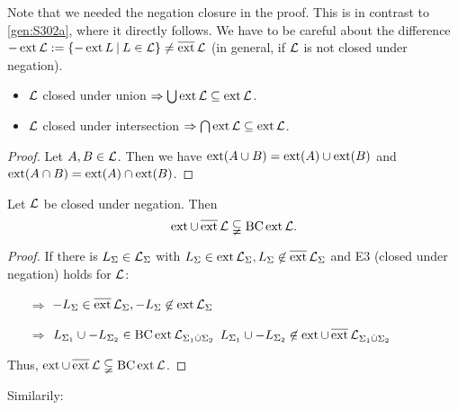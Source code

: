 Note that we needed the negation closure in the proof. This is in contrast to \ref{gen:S302a}, where it directly follows. We have to be careful about the difference $- \ext \Lang := \Set{-\ext L}{L \in \Lang} \neq \dext \Lang$ (in general, if $\mathcal{L}$ is not closed under negation).

\begin{lemma}
\begin{itemize}
\item
$\mathcal{L}$ closed under union $\Rightarrow \bigcup \operatorname{ext} \mathcal{L} \subseteq \operatorname{ext} \mathcal{L}$.
\item
$\mathcal{L}$ closed under intersection $\Rightarrow \bigcap \operatorname{ext} \mathcal{L} \subseteq \operatorname{ext} \mathcal{L}$.
\end{itemize}
\begin{proof}
Let $A,B \in \mathcal{L}$. Then we have $\operatorname{ext}(A\cup B) = \operatorname{ext}(A) \cup \operatorname{ext}(B)$ and $\operatorname{ext}(A\cap B) = \operatorname{ext}(A) \cap \operatorname{ext}(B)$.
\end{proof}
\end{lemma}

\begin{lemma}
Let $\mathcal{L}$ be closed under negation. Then
\[ \operatorname{ext} \cup \operatorname{\overline{ext}} \mathcal{L} \subsetneqq \operatorname{BC} \operatorname{ext} \mathcal{L} . \]
\begin{proof}
If there is $L_\Sigma \in \mathcal{L}_\Sigma$ with $L_\Sigma \in \operatorname{ext} \mathcal{L}_\Sigma, L_\Sigma \not\in \operatorname{\overline{ext}} \mathcal{L}_\Sigma$ and E3 (closed under negation) holds for $\mathcal{L}$:
\begin{itemize}
\item[$\Rightarrow$] $-L_\Sigma \in \operatorname{\overline{ext}} \mathcal{L}_\Sigma, -L_\Sigma \not\in \operatorname{ext} \mathcal{L}_\Sigma$
\item[$\Rightarrow$] $L_{\Sigma_1} \cup -L_{\Sigma_2} \in \operatorname{BC} \operatorname{ext} \mathcal{L}_{\Sigma_1 \dot{\cup} \Sigma_2}$ \newline
$L_{\Sigma_1} \cup -L_{\Sigma_2} \not\in \operatorname{ext} \cup \operatorname{\overline{ext}} \mathcal{L}_{\Sigma_1 \dot{\cup} \Sigma_2}$
\end{itemize}
Thus, $ \operatorname{ext} \cup \operatorname{\overline{ext}} \mathcal{L} \subsetneqq \operatorname{BC} \operatorname{ext} \mathcal{L}$.
\end{proof}
\end{lemma}

Similarily:

